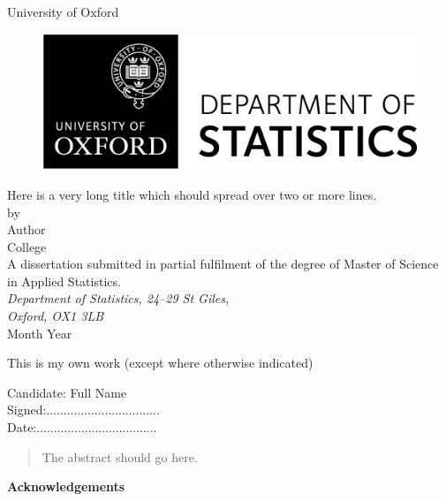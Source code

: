 \documentclass[a4paper,12pt]{article}
\begin{document}

\begin{titlepage}
\begin{center}
\vspace{1cm}
\textsf{\Huge{University of Oxford \\}}
\vspace{1cm}
\begin{figure}[htb]
\centering
\includegraphics[scale=.8]{Stats_Logo.png}
\end{figure}
\vspace{2.0cm}
\Huge{Here is a very long title which should spread over two or more lines.\\}
\vspace{2.0cm}
\large{ by \\[14pt] Author \\[8pt] College} \\
\vspace{2.2cm}
\large{A dissertation submitted in partial fulfilment of the degree of Master of Science in Applied Statistics.
} \\
\vspace{.5cm}
\large{\emph{Department of Statistics, 24--29 St Giles, \\Oxford, OX1 3LB}} \\
\vspace{1.0cm}
\large{Month Year} \\
\end{center}
\end{titlepage}
\clearpage

This is my own work (except where otherwise indicated)
\vspace{2.5in}

\begin{center}
Candidate: Full Name\\
\vspace{1.0in}
Signed:.................................\\
\vspace{1.0in}
Date:...................................
\end{center}
\clearpage
\begin{abstract}

The abstract should go here.

\end{abstract}
\clearpage
\vspace*{2in}
\begin{center}
\textbf{Acknowledgements}
\end{center}
\end{document}
